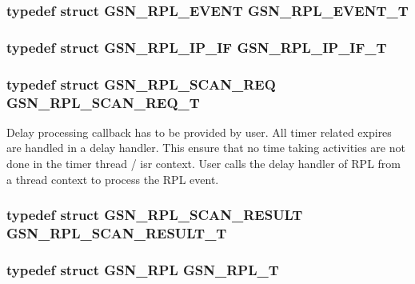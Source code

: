 \hypertarget{a00579_a3828181222414a7be42c9c7379651d15}{
\subsubsection[{GSN\_\-RPL\_\-EVENT\_\-T}]{\setlength{\rightskip}{0pt plus 5cm}typedef struct {\bf GSN\_\-RPL\_\-EVENT} {\bf GSN\_\-RPL\_\-EVENT\_\-T}}}
\label{a00579_a3828181222414a7be42c9c7379651d15}
\hypertarget{a00579_abff4d48cd844df33ee6332ef011ac7ae}{
\subsubsection[{GSN\_\-RPL\_\-IP\_\-IF\_\-T}]{\setlength{\rightskip}{0pt plus 5cm}typedef struct {\bf GSN\_\-RPL\_\-IP\_\-IF} {\bf GSN\_\-RPL\_\-IP\_\-IF\_\-T}}}
\label{a00579_abff4d48cd844df33ee6332ef011ac7ae}
\hypertarget{a00579_a95586790f6998cec77fd04b5565c3d21}{
\subsubsection[{GSN\_\-RPL\_\-SCAN\_\-REQ\_\-T}]{\setlength{\rightskip}{0pt plus 5cm}typedef struct {\bf GSN\_\-RPL\_\-SCAN\_\-REQ} {\bf GSN\_\-RPL\_\-SCAN\_\-REQ\_\-T}}}
\label{a00579_a95586790f6998cec77fd04b5565c3d21}
Delay processing callback has to be provided by user. All timer related expires are handled in a delay handler. This ensure that no time taking activities are not done in the timer thread / isr context. User calls the delay handler of RPL from a thread context to process the RPL event. \hypertarget{a00579_aabd8c14f063f4c7f36a451081ef059b0}{
\subsubsection[{GSN\_\-RPL\_\-SCAN\_\-RESULT\_\-T}]{\setlength{\rightskip}{0pt plus 5cm}typedef struct {\bf GSN\_\-RPL\_\-SCAN\_\-RESULT} {\bf GSN\_\-RPL\_\-SCAN\_\-RESULT\_\-T}}}
\label{a00579_aabd8c14f063f4c7f36a451081ef059b0}
\hypertarget{a00579_a220cddfa9f0fb98088268693eccbcb28}{
\subsubsection[{GSN\_\-RPL\_\-T}]{\setlength{\rightskip}{0pt plus 5cm}typedef struct {\bf GSN\_\-RPL} {\bf GSN\_\-RPL\_\-T}}}
\label{a00579_a220cddfa9f0fb98088268693eccbcb28}


